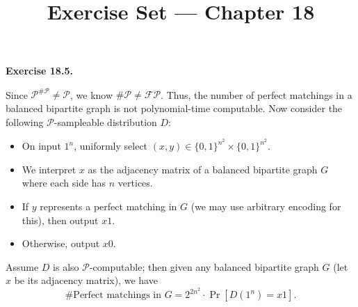 \documentclass[a4paper]{article}
\title{Exercise Set --- Chapter 18}
\date{}
\newenvironment{exercise}[1]{
	\par
	\noindent\textbf{Exercise #1.}\quad
}{
	\par
	\bigskip
}
\newcommand{\sbra}[1]{\left[ #1 \right]}
\newcommand{\bin}{\{0,1\}}
\begin{document}
    \maketitle

    \begin{exercise}{18.5}
    		Since $\mathcal P^{\#\mathcal P}\neq\mathcal P$, we know $\#\mathcal P\neq\mathcal{FP}$. Thus, the number of perfect matchings in a balanced bipartite graph is not polynomial-time computable. Now consider the following $\mathcal P$-sampleable distribution $D$:
    		\begin{itemize}
    		\item On input $1^n$, uniformly select $(x,y)\in\bin^{n^2}\times\bin^{n^2}$.
    		\item We interpret $x$ as the adjacency matrix of a balanced bipartite graph $G$ where each side has $n$ vertices.
    		\item If $y$ represents a perfect matching in $G$ (we may use arbitrary encoding for this), then output $x1$.
    		\item Otherwise, output $x0$.
    		\end{itemize}
    		Assume $D$ is also $\mathcal P$-computable; then given any balanced bipartite graph $G$ (let $x$ be its adjacency matrix), we have
    		$$
    		\#\text{Perfect matchings in $G$}=2^{2n^2}\cdot\Pr\sbra{D(1^n)=x1}.
    		$$
    \end{exercise}
\end{document}
